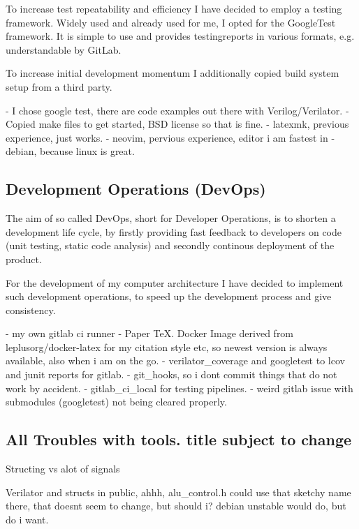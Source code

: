 To increase test repeatability and efficiency I have decided to employ a testing framework. Widely used and already used for me, I opted for the GoogleTest framework. It is simple to use and provides testingreports in various formats, e.g. understandable by GitLab. 

To increase initial development momentum I additionally copied build system setup from a third party.


- I chose google test, there are code examples out there with Verilog/Verilator. 
- Copied make files to get started, BSD license so that is fine. 
- latexmk, previous experience, just works.
- neovim, pervious experience, editor i am fastest in
- debian, because linux is great. 


\subsection{Development Operations (DevOps)}
The aim of so called DevOps, short for Developer Operations, is to shorten a development life cycle, by firstly providing fast feedback to developers on code (unit testing, static code analysis) and secondly continous deployment of the product.  

For the development of my computer architecture I have decided to implement such development operations, to speed up the development process and give consistency. 

- my own gitlab ci runner
- Paper TeX. Docker Image derived from leplusorg/docker-latex for my citation style etc, so newest version is always available, also when i am on the go. 
- verilator\_coverage and googletest to lcov and junit reports for gitlab. 
- git\_hooks, so i dont commit things that do not work by accident. 
- gitlab\_ci\_local for testing pipelines. 
- weird gitlab issue with submodules (googletest) not being cleared properly. 

\subsection{All Troubles with tools. title subject to change}
Structing vs alot of signals

Verilator and structs in public, ahhh, alu\_control.h could use that sketchy name there, that doesnt seem to change, but should i?
debian unstable would do, but do i want.









